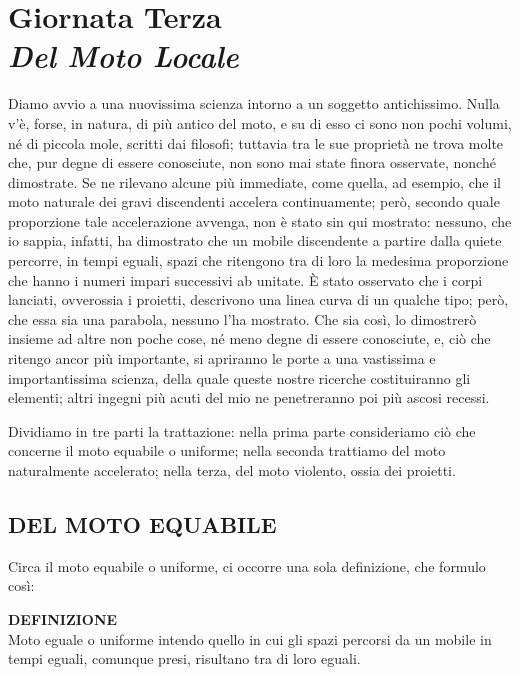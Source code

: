\documentclass[11pt,twoside,openany]{book}
\begin{document}
\chapter*{Giornata Terza\\{\normalsize\itshape Del Moto Locale}}
Diamo avvio a una nuovissima scienza intorno a un soggetto antichissimo. Nulla v'è, forse, in natura, di più antico del moto, e su di esso ci sono non pochi volumi, né di piccola mole, scritti dai filosofi; tuttavia tra le sue proprietà ne trova molte che, pur degne di essere conosciute, non sono mai state finora osservate, nonché dimostrate. Se ne rilevano alcune più immediate, come quella, ad esempio, che il moto naturale dei gravi discendenti accelera continuamente; però, secondo quale proporzione tale accelerazione avvenga, non è stato sin qui mostrato: nessuno, che io sappia, infatti, ha dimostrato che un mobile discendente a partire dalla quiete percorre, in tempi eguali, spazi che ritengono tra di loro la medesima proporzione che hanno i numeri impari successivi ab unitate. È stato osservato che i corpi lanciati, ovverossia i proietti, descrivono una linea curva di un qualche tipo; però, che essa sia una parabola, nessuno l'ha mostrato. Che sia così, lo dimostrerò insieme ad altre non poche cose, né meno degne di essere conosciute, e, ciò che ritengo ancor più importante, si apriranno le porte a una vastissima e importantissima scienza, della quale queste nostre ricerche costituiranno gli elementi; altri ingegni più acuti del mio ne penetreranno poi più ascosi recessi.

Dividiamo in tre parti la trattazione: nella prima parte consideriamo ciò che concerne il moto equabile o uniforme; nella seconda trattiamo del moto naturalmente accelerato; nella terza, del moto violento, ossia dei proietti.


\section*{DEL MOTO EQUABILE}

Circa il moto equabile o uniforme, ci occorre una sola definizione, che formulo così:

\textbf{DEFINIZIONE\\}Moto eguale o uniforme intendo quello in cui gli spazi percorsi da un mobile in tempi eguali, comunque presi, risultano tra di loro eguali.
\end{document}
